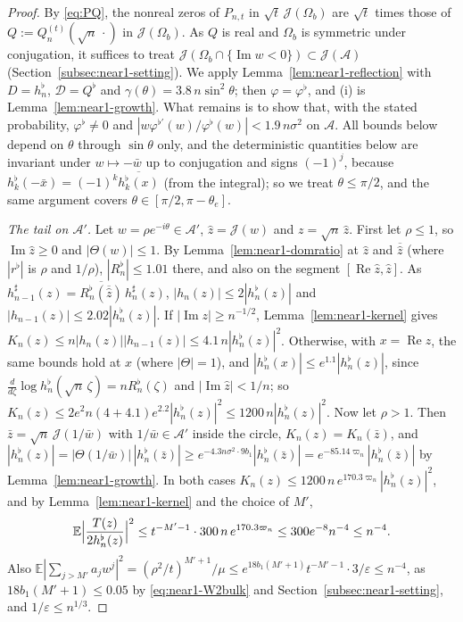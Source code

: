 \documentclass[11pt]{amsart}
\theoremstyle{definition}
\theoremstyle{remark}
\numberwithin{equation}{section}
\newcommand{\E}{\mathbb{E}}
\newcommand{\eps}{\varepsilon}
\DeclareMathOperator{\re}{Re}
\DeclareMathOperator{\im}{Im}
\begin{document}
\begin{proof}
By \eqref{eq:PQ}, the nonreal zeros of $P_{n,t}$ in $\sqrt t\,\mathcal J(\Omega_b)$ are $\sqrt t$ times those of $Q:=Q_n^{(t)}(\sqrt n\,\cdot)$ in $\mathcal J(\Omega_b)$. As $Q$ is real and $\Omega_b$ is symmetric under conjugation, it suffices to treat $\mathcal J(\Omega_b\cap\{\im w<0\})\subset\mathcal J(\mathcal A)$ (Section~\ref{subsec:near1-setting}). We apply Lemma~\ref{lem:near1-reflection} with $D=h_n^\flat$, $\mathcal D=Q^\flat$ and $\gamma(\theta)=3.8\,n\sin^2\theta$; then $\varphi=\varphi^\flat$, and (i) is Lemma~\ref{lem:near1-growth}. What remains is to show that, with the stated probability, $\varphi^\flat\ne0$ and $|w\varphi^{\flat\prime}(w)/\varphi^\flat(w)|<1.9\,n\sigma^2$ on $\mathcal A$. All bounds below depend on $\theta$ through $\sin\theta$ only, and the deterministic quantities below are invariant under $w\mapsto-\bar w$ up to conjugation and signs $(-1)^j$, because $h_k^\flat(-\bar x)=(-1)^k\overline{h_k^\flat(x)}$ (from the integral); so we treat $\theta\le\pi/2$, and the same argument covers $\theta\in[\pi/2,\pi-\theta_e]$.

\emph{The tail on $\mathcal A'$.} Let $w=\rho e^{-i\theta}\in\mathcal A'$, $\hat z=\mathcal J(w)$ and $z=\sqrt n\,\hat z$. First let $\rho\le1$, so $\im\hat z\ge0$ and $|\Theta(w)|\le1$. By Lemma~\ref{lem:near1-domratio} at $\hat z$ and $\overline{\hat z}$ (where $|r^\flat|$ is $\rho$ and $1/\rho$), $|R_n^\flat|\le1.01$ there, and also on the segment $[\re\hat z,\hat z]$. As $h_{n-1}^\sharp(z)=\overline{R_n^\flat(\overline{\hat z})}\,h_n^\sharp(z)$, $|h_n(z)|\le2|h_n^\flat(z)|$ and $|h_{n-1}(z)|\le2.02|h_n^\flat(z)|$. If $|\im z|\ge n^{-1/2}$, Lemma~\ref{lem:near1-kernel} gives $K_n(z)\le n|h_n(z)||h_{n-1}(z)|\le4.1\,n|h_n^\flat(z)|^2$. Otherwise, with $x=\re z$, the same bounds hold at $x$ (where $|\Theta|=1$), and $|h_n^\flat(x)|\le e^{1.1}|h_n^\flat(z)|$, since $\frac d{d\zeta}\log h_n^\flat(\sqrt n\,\zeta)=nR_n^\flat(\zeta)$ and $|\im\hat z|<1/n$; so $K_n(z)\le2e^2n(4+4.1)e^{2.2}|h_n^\flat(z)|^2\le1200\,n|h_n^\flat(z)|^2$. Now let $\rho>1$. Then $\bar z=\sqrt n\,\mathcal J(1/\bar w)$ with $1/\bar w\in\mathcal A'$ inside the circle, $K_n(z)=K_n(\bar z)$, and $|h_n^\flat(z)|=|\Theta(1/\bar w)|\,|h_n^\flat(\bar z)|\ge e^{-4.3n\sigma^2\cdot9b_1}|h_n^\flat(\bar z)|=e^{-85.14\varpi_n}|h_n^\flat(\bar z)|$ by Lemma~\ref{lem:near1-growth}. In both cases $K_n(z)\le1200\,n\,e^{170.3\varpi_n}|h_n^\flat(z)|^2$, and by Lemma~\ref{lem:near1-kernel} and the choice of $M'$,
\[
\E\Bigl|\frac{T(z)}{2h_n^\flat(z)}\Bigr|^2\le t^{-M'-1}\cdot300\,n\,e^{170.3\varpi_n}\le300e^{-8}n^{-4}\le n^{-4}.
\]
Also $\E|\sum_{j>M'}a_jw^j|^2=(\rho^2/t)^{M'+1}/\mu\le e^{18b_1(M'+1)}t^{-M'-1}\cdot3/\eps\le n^{-4}$, as $18b_1(M'+1)\le0.05$ by \eqref{eq:near1-W2bulk} and Section~\ref{subsec:near1-setting}, and $1/\eps\le n^{1/3}$.


\end{proof}
\end{document}
